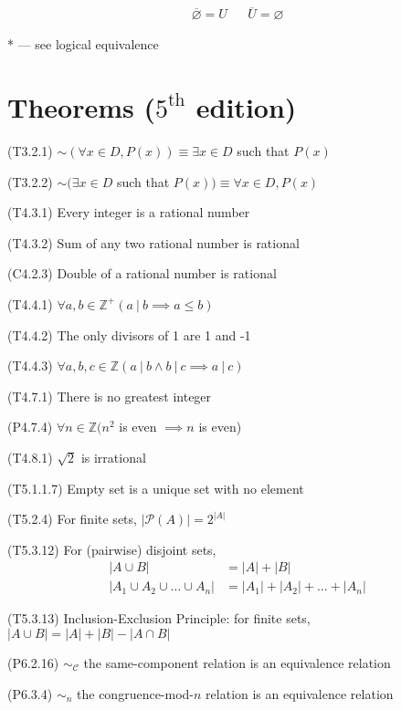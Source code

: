 \documentclass[landscape, a4paper]{article}
\let\leq\leqslant
\newcommand{\Z}{\mathbb{Z}}
\newcommand{\C}{\mathscr{C}}
\renewcommand{\P}{\mathcal{P}}
\renewcommand{\and}{\wedge}
\newcommand{\customsection}[1]{
    \vspace*{-16pt}
    \section*{#1}
    \vspace*{-4pt}
}
\newenvironment{wenumerate}{\begin{enumerate}[wide, labelindent=2pt]}{\end{enumerate}}
\begin{document}
\begin{multicols*}{4}
\begin{wenumerate}
        \begin{align*}
            \overline{\varnothing}=U &  & \overline{U}=\varnothing
        \end{align*}
    \end{wenumerate}
    * --- see logical equivalence
    \customsection{Theorems ($\text{5}^{\text{th}}$ edition)}
    \begin{description}[leftmargin=4pt]
        \item (T3.2.1) ${\sim} (\forall x\in D, P(x)) \equiv \exists x\in D$ such that $P(x)$
        \item (T3.2.2) ${\sim} (\exists x\in D$ such that $P(x)) \equiv \forall x\in D, P(x)$
        \item (T4.3.1) Every integer is a rational number
        \item (T4.3.2) Sum of any two rational number is rational
        \item (C4.2.3) Double of a rational number is rational
        \item (T4.4.1) $\forall a,b\in\Z^+ (a\ |\ b\implies a\leq b)$
        \item (T4.4.2) The only divisors of 1 are 1 and -1
        \item (T4.4.3) $\forall a,b,c\in\Z (a\ |\ b \and b\ |\ c\implies a\ |\ c)$
        \item (T4.7.1) There is no greatest integer
        \item (P4.7.4) $\forall n\in\Z (n^2$ is even $\implies n$ is even)
        \item (T4.8.1) $\sqrt{2}$ is irrational
        \item (T5.1.1.7) Empty set is a unique set with no element
        \item (T5.2.4) For finite sets, $|\P(A)|=2^{|A|}$
        \item (T5.3.12) For (pairwise) disjoint sets,
              \begin{align*}
                  |A\cup B|                         & =|A|+|B|                  \\
                  |A_1\cup A_2\cup \ldots \cup A_n| & =|A_1|+|A_2|+\ldots+|A_n|
              \end{align*}
        \item (T5.3.13) Inclusion-Exclusion Principle: for finite sets, $|A\cup B|=|A|+|B|-|A\cap B|$
        \item (P6.2.16) ${\sim}_\C$ the same-component relation is an equivalence relation
        \item (P6.3.4) ${\sim}_n$ the congruence-mod-$n$ relation is an equivalence relation

\end{description}
\end{multicols*}
\end{document}
